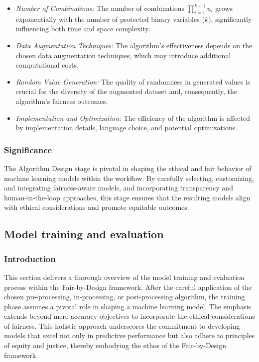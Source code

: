\begin{itemize}
    \item \emph{Number of Combinations:} The number of combinations \(\prod_{i=1}^{k+1} u_i\) grows exponentially with the number of protected binary variables (\(k\)), significantly influencing both time and space complexity.
    
    \item \emph{Data Augmentation Techniques:} The algorithm's effectiveness depends on the chosen data augmentation techniques, which may introduce additional computational costs.
    
    \item \emph{Random Value Generation:} The quality of randomness in generated values is crucial for the diversity of the augmented dataset and, consequently, the algorithm's fairness outcomes.
    
    \item \emph{Implementation and Optimization:} The efficiency of the algorithm is affected by implementation details, language choice, and potential optimizations.
\end{itemize}

\subsubsection{Significance}

The Algorithm Design stage is pivotal in shaping the ethical and fair behavior of machine learning models within the workflow. By carefully selecting, customizing, and integrating fairness-aware models, and incorporating transparency and human-in-the-loop approaches, this stage ensures that the resulting models align with ethical considerations and promote equitable outcomes.

\subsection{Model training and evaluation}
\label{subsection:model-training}

\subsubsection{Introduction}

This section delivers a thorough overview of the model training and evaluation process within the Fair-by-Design framework. After the careful application of the chosen pre-processing, in-processing, or post-processing algorithm, the training phase assumes a pivotal role in shaping a machine learning model. The emphasis extends beyond mere accuracy objectives to incorporate the ethical considerations of fairness. This holistic approach underscores the commitment to developing models that excel not only in predictive performance but also adhere to principles of equity and justice, thereby embodying the ethos of the Fair-by-Design framework.


